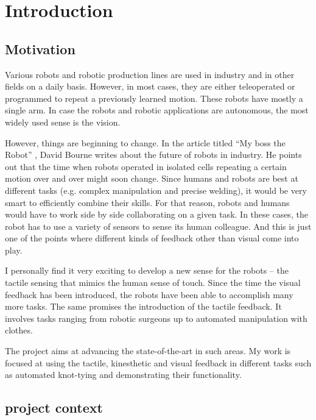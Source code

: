 \graphicspath{{Img/intro/}}

\section{Introduction}

    \subsection{Motivation}
        Various robots and robotic production lines are used in industry and in other fields on a daily basis. However, in most cases, they are either teleoperated or programmed to repeat a previously learned motion. These robots have mostly a single arm. In case the robots and robotic applications are autonomous, the most widely used sense is the vision.

        However, things are beginning to change. In the article titled ``My boss the Robot'' \cite{bourne13}, David Bourne writes about the future of robots in industry. He points out that the time when robots operated in isolated cells repeating a certain motion over and over might soon change. Since humans and robots are best at different tasks (e.g. complex manipulation and precise welding), it would be very smart to efficiently combine their skills. For that reason, robots and humans would have to work side by side collaborating on a given task. In these cases, the robot has to use a variety of sensors to sense its human colleague. And this is just one of the points where different kinds of feedback other than visual come into play.

        I personally find it very exciting to develop a new sense for the robots -- the tactile sensing that mimics the human sense of touch. Since the time the visual feedback has been introduced, the robots have been able to accomplish many more tasks. The same promises the introduction of the tactile feedback. It involves tasks ranging from robotic surgeons up to automated manipulation with clothes.

        The \CloPeMa\/ project aims at advancing the state-of-the-art in such areas. My work is focused at using the tactile, kinesthetic and visual feedback in different tasks such as automated knot-tying and demonstrating their functionality.

    \subsection{\CloPeMa\/ project context}

